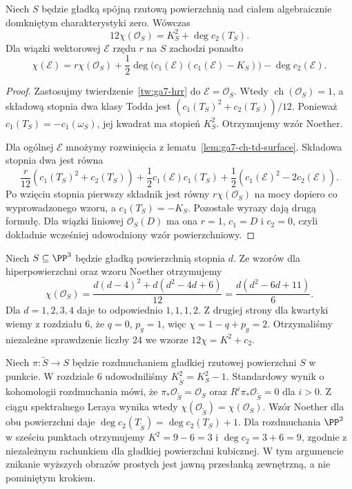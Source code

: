 \begin{twierdzenie}
\label{tw:ga7-noether}
Niech $S$ będzie gładką spójną rzutową powierzchnią
nad ciałem algebraicznie domkniętym charakterystyki zero.
Wówczas
\[
12\chi(\mathcal O_S)=K_S^2+\deg c_2(T_S).
\]
Dla wiązki wektorowej $\mathcal E$ rzędu $r$ na $S$
zachodzi ponadto
\[
\chi(\mathcal E)=r\chi(\mathcal O_S)
+\frac12\deg\bigl(c_1(\mathcal E)
(c_1(\mathcal E)-K_S)\bigr)
-\deg c_2(\mathcal E).
\]
\end{twierdzenie}
\begin{proof}
Zastosujmy twierdzenie~\ref{tw:ga7-hrr} do
$\mathcal E=\mathcal O_S$. Wtedy
$\operatorname{ch}(\mathcal O_S)=1$,
a składową stopnia dwa klasy Todda jest
$(c_1(T_S)^2+c_2(T_S))/12$.
Ponieważ $c_1(T_S)=-c_1(\omega_S)$, jej kwadrat
ma stopień $K_S^2$. Otrzymujemy wzór Noether.

Dla ogólnej $\mathcal E$ mnożymy rozwinięcia
z lematu~\ref{lem:ga7-ch-td-surface}. Składowa
stopnia dwa jest równa
\[
\frac r{12}(c_1(T_S)^2+c_2(T_S))
+\frac12c_1(\mathcal E)c_1(T_S)
+\frac12(c_1(\mathcal E)^2-2c_2(\mathcal E)).
\]
Po wzięciu stopnia pierwszy składnik jest równy
$r\chi(\mathcal O_S)$ na mocy dopiero co
wyprowadzonego wzoru, a $c_1(T_S)=-K_S$.
Pozostałe wyrazy dają drugą formułę.
Dla wiązki liniowej $\mathcal O_S(D)$ ma ona
$r=1$, $c_1=D$ i $c_2=0$, czyli dokładnie
wcześniej udowodniony wzór powierzchniowy.
\end{proof}

\begin{przyklad}
Niech $S\subseteq\PP^3$ będzie gładką powierzchnią
stopnia $d$. Ze wzorów dla hiperpowierzchni oraz
wzoru Noether otrzymujemy
\[
\chi(\mathcal O_S)=\frac{d(d-4)^2+d(d^2-4d+6)}{12}
=\frac{d(d^2-6d+11)}6.
\]
Dla $d=1,2,3,4$ daje to odpowiednio $1,1,1,2$.
Z drugiej strony dla kwartyki wiemy z rozdziału 6,
że $q=0$, $p_g=1$, więc $\chi=1-q+p_g=2$.
Otrzymaliśmy niezależne sprawdzenie liczby $24$
we wzorze $12\chi=K^2+c_2$.
\end{przyklad}

\begin{przyklad}
\label{prz:ga7-blowup-c2}
Niech $\pi:\widetilde S\to S$ będzie rozdmuchaniem
gładkiej rzutowej powierzchni $S$ w punkcie.
W rozdziale 6 udowodniliśmy
$K_{\widetilde S}^2=K_S^2-1$.
Standardowy wynik o kohomologii rozdmuchania mówi, że
$\pi_*\mathcal O_{\widetilde S}=\mathcal O_S$ oraz
$R^i\pi_*\mathcal O_{\widetilde S}=0$ dla $i>0$.
Z ciągu spektralnego Leraya wynika wtedy
$\chi(\mathcal O_{\widetilde S})=\chi(\mathcal O_S)$.
Wzór Noether dla obu powierzchni daje
$\deg c_2(T_{\widetilde S})=\deg c_2(T_S)+1$.
Dla rozdmuchania $\PP^2$ w sześciu punktach otrzymujemy
$K^2=9-6=3$ i $\deg c_2=3+6=9$, zgodnie
z niezależnym rachunkiem dla gładkiej powierzchni kubicznej.
W tym argumencie znikanie wyższych obrazów prostych
jest jawną przesłanką zewnętrzną, a nie pominiętym krokiem.
\end{przyklad}

